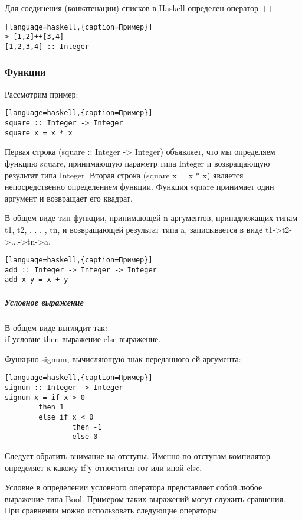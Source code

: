\documentclass[a4paper,12pt]{article}
\begin{document}
Для соединения (конкатенации) списков в Haskell определен оператор ++.

\begin{lstlisting}[language=haskell,{caption=Пример}]
> [1,2]++[3,4]
[1,2,3,4] :: Integer
\end{lstlisting}

\subsubsection{Функции} Рассмотрим пример:

\begin{lstlisting}[language=haskell,{caption=Пример}]
square :: Integer -> Integer
square x = x * x
\end{lstlisting}

Первая строка (square :: Integer -> Integer) объявляет, что мы определяем функцию square, принимающую параметр типа Integer и возвращающую результат типа Integer. Вторая строка (square x = x * x) является непосредственно определением функции. Функция square принимает один аргумент и возвращает его квадрат.

В общем виде тип функции, принимающей n аргументов, принадлежащих типам t1, t2, . . . , tn, и возвращающей результат типа a, записывается в виде t1->t2->...->tn->a.

\begin{lstlisting}[language=haskell,{caption=Пример}]
add :: Integer -> Integer -> Integer
add x y = x + y
\end{lstlisting}

\subparagraph{Условное выражение} В общем виде выглядит так: \\
if условие then выражение else выражение.

Функцию signum, вычисляющую знак переданного ей аргумента:

\begin{lstlisting}[language=haskell,{caption=Пример}]
signum :: Integer -> Integer
signum x = if x > 0
        then 1
        else if x < 0
                then -1
                else 0
\end{lstlisting}

Следует обратить внимание на отступы. Именно по отступам компилятор определяет к какому 
if'у отностится тот или иной else.

Условие в определении условного оператора представляет собой любое выражение типа Bool. Примером таких выражений могут служить сравнения. При сравнении можно использовать следующие операторы:
\end{document}
